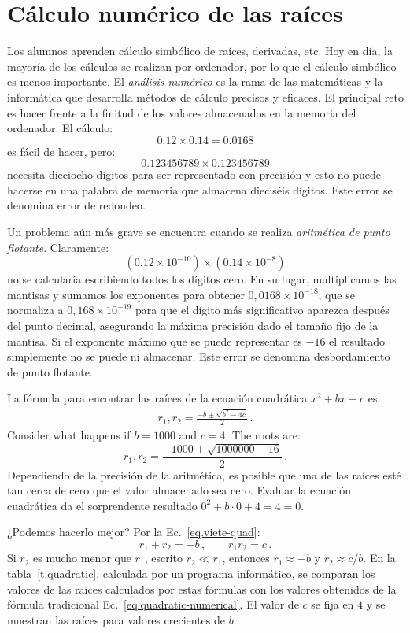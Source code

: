 \section{Cálculo numérico de las raíces}\label{s.numerical}

Los alumnos aprenden cálculo simbólico de raíces, derivadas, etc. Hoy en día, la mayoría de los cálculos se realizan por ordenador, por lo que el cálculo simbólico es menos importante. El \emph{análisis numérico} es la rama de las matemáticas y la informática que desarrolla métodos de cálculo precisos y eficaces. El principal reto es hacer frente a la finitud de los valores almacenados en la memoria del ordenador. El cálculo:
\[0.12 \times 0.14=0.0168\]
es fácil de hacer, pero:
\[
0.123456789\times 0.123456789\]
necesita dieciocho dígitos para ser representado con precisión y esto no puede hacerse en una palabra de memoria que almacena dieciséis dígitos. Este error se denomina error de redondeo.

Un problema aún más grave se encuentra cuando se realiza \emph{aritmética de punto flotante}. Claramente:
\[(0.12\times 10^{-10})\times (0.14\times 10^{-8})\]
no se calcularía escribiendo todos los dígitos cero. En su lugar, multiplicamos las mantisas y sumamos los exponentes para obtener $0,0168\times 10^{-18}$, que se normaliza a $0,168\times 10^{-19}$ para que el dígito más significativo aparezca después del punto decimal, asegurando la máxima precisión dado el tamaño fijo de la mantisa. Si el exponente máximo que se puede representar es $-16$ el resultado simplemente no se puede ni almacenar. Este error se denomina desbordamiento de punto flotante.

La fórmula para encontrar las raíces de la ecuación cuadrática $x^2+bx+c$ es:
\begin{align}
r_1, r_2 = \frac{-b\pm\sqrt{b^2-4c}}{2}\,.\label{eq.quadratic-numerical}
\end{align}
Consider what happens if $b=1000$ and $c=4$. The roots are:
\[
r_1, r_2 = \frac{-1000\pm\sqrt{1000000-16}}{2}\,.
\]
Dependiendo de la precisión de la aritmética, es posible que una de las raíces esté tan cerca de cero que el valor almacenado sea cero. Evaluar la ecuación cuadrática da el sorprendente resultado $0^2+b\cdot 0 +4= 4= 0$.

¿Podemos hacerlo mejor? Por la Ec.~\ref{eq.viete-quad}:
\[
r_1+r_2 = -b\,,\quad\quad r_1r_2=c\,.
\]
Si $r_2$ es mucho menor que $r_1$, escrito $r_2\ll r_1$, entonces $r_1\approx -b$ y $r_2\approx c/b$. En la tabla~\ref{t.quadratic}, calculada por un programa informático, se comparan los valores de las raíces calculados por estas fórmulas con los valores obtenidos de la fórmula tradicional Ec.~\ref{eq.quadratic-numerical}. El valor de $c$ se fija en $4$ y se muestran las raíces para valores crecientes de $b$.

